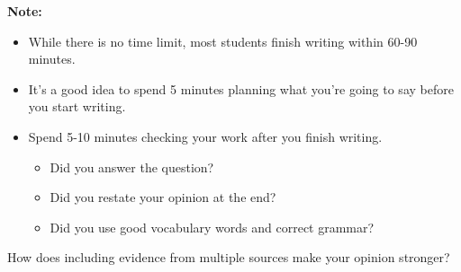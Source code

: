 \documentclass[12pt]{article}
\begin{document}
\begin{tcolorbox}[colframe=black!40, colback=gray!5, 
coltitle=black, colbacktitle=black!20, fonttitle=\bfseries\Large, 
title=Additional Notes, halign title=center, left=5pt, right=5pt, top=5pt, bottom=15pt]
\textbf{Note:}
\begin{itemize}
    \item While there is no time limit, most students finish writing within 60-90 minutes. 
    \item It's a good idea to spend 5 minutes planning what you're going to say before you start writing.
    \item Spend 5-10 minutes checking your work after you finish writing. 
    \begin{itemize}
        \item Did you answer the question?
        \item Did you restate your opinion at the end?
        \item Did you use good vocabulary words and correct grammar?
    \end{itemize}



\end{itemize}
\end{tcolorbox}

\vspace{1em}

\begin{tcolorbox}[colframe=black!60, colback=white, 
coltitle=black, colbacktitle=black!15, fonttitle=\bfseries\Large, 
title=Exit Ticket, halign title=center, left=10pt, right=10pt, top=10pt, bottom=15pt]
How does including evidence from multiple sources make your opinion stronger?
\vspace{15em}
\end{tcolorbox}
\end{document}
